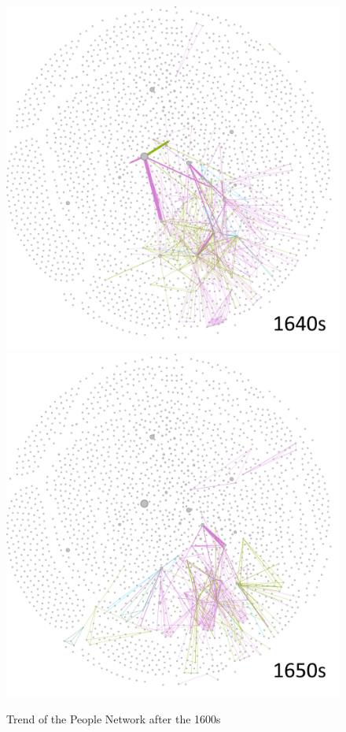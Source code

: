 \documentclass[12pt,a4paper,oneside]{book}
\begin{document}
\begin{sloppypar}
\begin{figure}[H]
\includegraphics[scale=0.4]{graph/People_1640s.png}
\includegraphics[scale=0.4]{graph/People_1650s.png}
\caption{Trend of the People Network after the 1600s}
\label{fig:peoNetAfter1600}
\end{figure}


\end{sloppypar}
\end{document}
